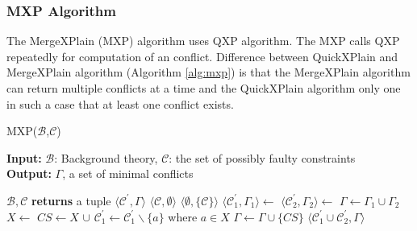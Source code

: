 \documentclass[12pt,a4paper]{article}
\begin{document}
\subsubsection{MXP Algorithm}
The MergeXPlain (MXP) algorithm uses QXP algorithm. The MXP calls QXP repeatedly for computation of an conflict. Difference between QuickXPlain and MergeXPlain algorithm (Algorithm \ref{alg:mxp}) is that the MergeXPlain algorithm can return multiple conflicts at a time and the QuickXPlain algorithm only one in such a case that at least one conflict exists. 

\begin{algorithm}[H]
	\footnotesize
	\caption{MXP($\mathcal{B}$,$\mathcal{C}$)}
	\label{alg:mxp}
	\textbf{Input:} $\mathcal{B}$: Background theory, $\mathcal{C}$: the set of possibly faulty constraints  \\
	\textbf{Output:} $\Gamma$, a set of minimal conflicts
	\begin{algorithmic}[1]
		\State {}
		\State \Return {$\emptyset$}
		\EndIf
		\State \Return {$\Gamma$}
		
		\medskip
		 {$\mathcal{B}, \mathcal{C}$} \textbf{returns} a tuple $\langle \mathcal{C}^{\prime}, \Gamma \rangle$
		\State \Return $\langle \mathcal{C}, \emptyset \rangle$
		\State \Return $\langle \emptyset, \{\mathcal{C}\} \rangle$
		\EndIf
		\State $\langle \mathcal{C}_{1}^{\prime}, \Gamma_{1} \rangle \gets$ 
		\State $\langle \mathcal{C}_{2}^{\prime}, \Gamma_{2} \rangle \gets$ 
		\State $\Gamma \gets \Gamma_{1} \cup \Gamma_{2}$
		\State $X \gets $ 
		\State $CS \gets X$ $\cup$ 
		\State $\mathcal{C}_{1}^{\prime} \gets \mathcal{C}_{1}^{\prime} \backslash \{a\}$ where $a \in X$
		\State $\Gamma \gets \Gamma \cup \{CS\}$
		\EndWhile
		\State \Return $\langle \mathcal{C}_{1}^{\prime} \cup \mathcal{C}_{2}^{\prime}, \Gamma \rangle$
		\EndFunction			
	\end{algorithmic}
\end{algorithm}
\end{document}
